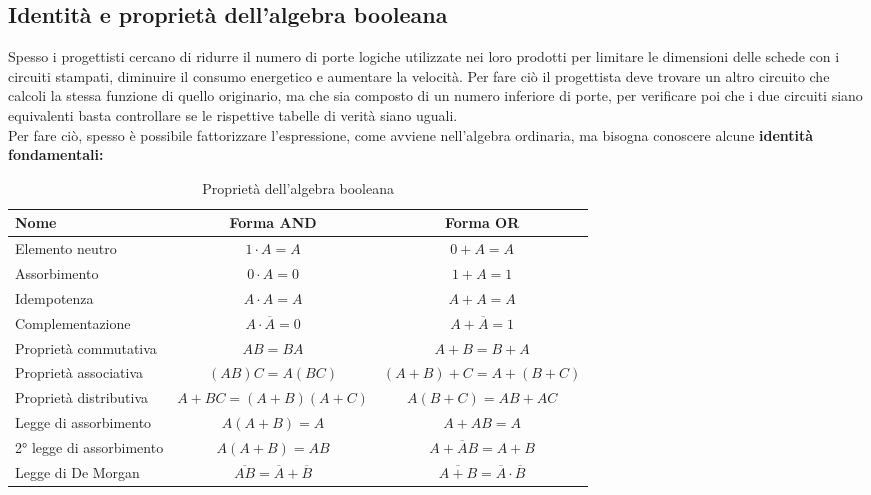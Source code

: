 \documentclass[12pt]{report}
\begin{document}
			\subsection{Identità e proprietà dell'algebra booleana}
			Spesso i progettisti cercano di ridurre il numero di porte logiche utilizzate nei loro prodotti per limitare le dimensioni delle schede con i circuiti stampati, diminuire il consumo energetico e aumentare la velocità. Per fare ciò il progettista deve trovare un altro circuito che calcoli la stessa funzione di quello originario, ma che sia composto di un numero inferiore di porte, per verificare poi che i due circuiti siano equivalenti basta controllare se le rispettive tabelle di verità siano uguali. \\
			Per fare ciò, spesso è possibile fattorizzare l'espressione, come avviene nell'algebra ordinaria, ma bisogna conoscere alcune \textbf{identità fondamentali:}
			\begin{table}[H]
				\centering
				\begin{tabular}{|l|c|c|}
					\hline
					\textbf{Nome} & \textbf{Forma AND} & \textbf{Forma OR} \\
					\hline
					Elemento neutro & $1 \cdot A = A$ & $0 + A = A$ \\
					\hline
					Assorbimento & $0 \cdot A = 0$ & $1 + A = 1$ \\
					\hline
					Idempotenza & $A \cdot A = A$ & $A + A = A$ \\
					\hline
					Complementazione & $A \cdot \overline{A} = 0$ & $A + \overline{A} = 1$ \\
					\hline
					Proprietà commutativa & $AB = BA$ & $A + B = B + A$ \\
					\hline
					Proprietà associativa & $(AB)C = A(BC)$ & $(A + B) + C = A + (B + C)$ \\
					\hline
					Proprietà distributiva & $A + BC = (A + B)(A + C)$ & $A(B + C) = AB + AC$ \\
					\hline
					Legge di assorbimento & $A(A + B) = A$ & $A + AB = A$ \\
					\hline
					2° legge di assorbimento & $A(A + B) = AB$ & $A + \overline{A}B = A + B$ \\
					\hline
					Legge di De Morgan & $\overline{AB} = \overline{A} + \overline{B}$ & $\overline{A + B} = \overline{A} \cdot \overline{B}$ \\
					\hline
				\end{tabular}
				\caption{Proprietà dell'algebra booleana}
				\label{tab:boolean_algebra}
			\end{table}
\end{document}
